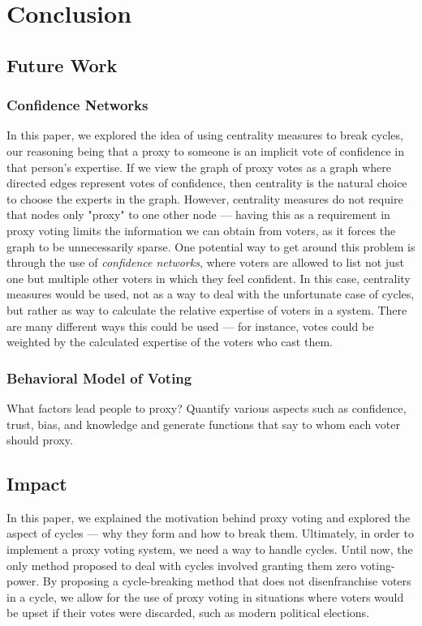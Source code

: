 \documentclass[10pt]{article}
\theoremstyle{definition}
\begin{document}
\section{Conclusion}

\subsection{Future Work}
\subsubsection{Confidence Networks}

In this paper, we explored the idea of using centrality measures to break cycles, our reasoning being that a proxy to someone is an implicit vote of confidence in that person's expertise. If we view the graph of proxy votes as a graph where directed edges represent votes of confidence, then centrality is the natural choice to choose the experts in the graph. However, centrality measures do not require that nodes only "proxy" to one other node --- having this as a requirement in proxy voting limits the information we can obtain from voters, as it forces the graph to be unnecessarily sparse. One potential way to get around this problem is through the use of \textit{confidence networks}, where voters are allowed to list not just one but multiple other voters in which they feel confident. In this case, centrality measures would be used, not as a way to deal with the unfortunate case of cycles, but rather as way to calculate the relative expertise of voters in a system. There are many different ways this could be used --- for instance, votes could be weighted by the calculated expertise of the voters who cast them.

\subsubsection{Behavioral Model of Voting}

What factors lead people to proxy? Quantify various aspects such as confidence, trust, bias, and knowledge and generate functions that say to whom each voter should proxy.

\subsection{Impact}
In this paper, we explained the motivation behind proxy voting and explored the aspect of cycles --- why they form and how to break them. Ultimately, in order to implement a proxy voting system, we need a way to handle cycles. Until now, the only method proposed to deal with cycles involved granting them zero voting-power. By proposing a cycle-breaking method that does not disenfranchise voters in a cycle, we allow for the use of proxy voting in situations where voters would be upset if their votes were discarded, such as modern political elections.
\end{document}
